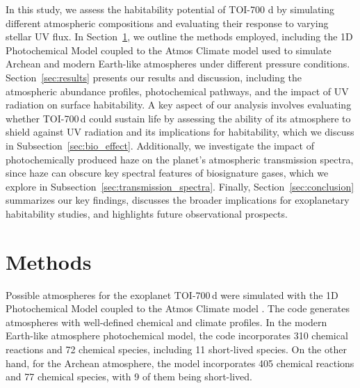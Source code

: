 
In this study, we assess the habitability potential of TOI-700 d by simulating different atmospheric compositions and evaluating their response to varying stellar UV flux. In Section~\ref{sec:methods}, we outline the methods employed, including the 1D Photochemical Model coupled to the Atmos Climate model used to simulate Archean and modern Earth-like atmospheres under different pressure conditions. Section~\ref{sec:results} presents our results and discussion, including the atmospheric abundance profiles, photochemical pathways, and the impact of UV radiation on surface habitability. A key aspect of our analysis involves evaluating whether TOI-700\,d could sustain life by assessing the ability of its atmosphere to shield against UV radiation and its implications for habitability, which we discuss in Subsection~\ref{sec:bio_effect}. 
Additionally, we investigate the impact of photochemically produced haze on the planet’s atmospheric transmission spectra, since haze can obscure key spectral features of biosignature gases, which we explore in Subsection~\ref{sec:transmission_spectra}. Finally, Section~\ref{sec:conclusion} summarizes our key findings, discusses the broader implications for exoplanetary habitability studies, and highlights future observational prospects.

\section{Methods} \label{sec:methods}

Possible atmospheres for the exoplanet TOI-700\,d were simulated with the 1D Photochemical Model coupled to the Atmos Climate model \citep{Arney.et.al.2016AsBio..16..873A}. The code generates atmospheres with well-defined chemical and climate profiles. 
In the modern Earth-like atmosphere photochemical model, the code incorporates 310 chemical reactions and 72 chemical species, including 11 short-lived species. On the other hand, for the Archean atmosphere, the model incorporates 405 chemical reactions and 77 chemical species, with 9 of them being short-lived. 

